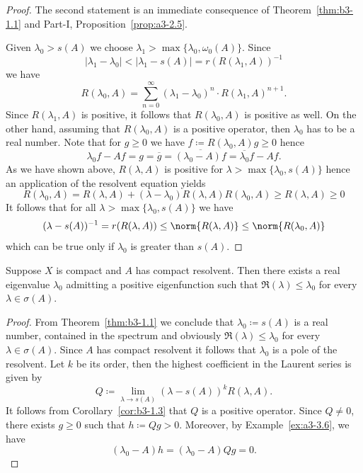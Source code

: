 \begin{proof}
	The second statement is an immediate consequence of Theorem~\ref{thm:b3-1.1} and Part-I, Proposition~\ref{prop:a3-2.5}.
	
	Given $\lambda_0 > s(A)$ we choose $\lambda_1 > \max\{\lambda_0,\omega_{0}(A)\}$.
	Since 
	\[
	\text{$|\lambda_1 - \lambda_0| < |\lambda_1 - s(A)| = r(R(\lambda_1,A))^{-1}$}
	\]
	we have
	\begin{equation}\label{eq:b3-1.10}
		R(\lambda_0,A) = \sum_{n=0}^{\infty} (\lambda_1 - \lambda_0)^n \cdot R(\lambda_1,A)^{n+1}.
	\end{equation}
	Since $R(\lambda_1,A)$ is positive, it follows that $R(\lambda_0,A)$ is positive as well.
	On the other hand, assuming that $R(\lambda_0,A)$ is a positive operator, then $\lambda_0$ has to be a real number.
	Note that for $g \geq 0$ we have $f \coloneqq R(\lambda_0,A)g \geq 0$ hence 
\[
	\lambda_0f - Af = g = \overline{g} = \overline{(\lambda_0 - A)f} = \overline{\lambda_0}f - Af .
\]
%
As we have shown above, $R(\lambda,A)$ is positive for $\lambda > \max\{\lambda_0,s(A)\}$ hence an application of the resolvent equation yields
	\begin{equation}\label{eq:b3-1.11}
		R(\lambda_0,A) = R(\lambda,A) + (\lambda - \lambda_0)R(\lambda,A)R(\lambda_0,A) \geq R(\lambda,A) \geq 0
	\end{equation}
	It follows that for all $\lambda > \max\{\lambda_{0},s(A)\}$ we have
	\begin{equation}\label{eq:b3-1.12}
		(\lambda - s(A))^{-1} = r(R(\lambda,A)) \leq \norm{R(\lambda,A)} \leq \norm{R(\lambda_{0},A)}
	\end{equation}
	which can be true only if\/ $\lambda_{0}$ is greater than $s(A)$.
\end{proof}
\begin{corollary}\label{cor:b3-1.4}
Suppose $X$ is compact and $A$ has compact resolvent.	
	Then there exists a real eigenvalue $\lambda_{0}$ admitting a positive eigenfunction such that 
	$\Re(\lambda) \leq \lambda_{0}$ for every $\lambda \in \sigma(A)$.
\end{corollary}
\begin{proof}
	From Theorem~\ref{thm:b3-1.1} we conclude that $\lambda_{0} \coloneqq s(A)$ is a real number, contained in the spectrum and obviously $\Re(\lambda) \leq \lambda_{0}$ for every $\lambda \in \sigma(A)$.
	Since $A$ has compact resolvent it follows that $\lambda_{0}$ is a pole of the resolvent.
	Let $k$ be its order, then the highest coefficient in the Laurent series is given by
	\begin{equation}\label{eq:b3-1.13}
		Q \coloneqq \lim_{\lambda \to s(A)} (\lambda - s(A))^{k}R(\lambda,A).
	\end{equation}
It follows from Corollary~\ref{cor:b3-1.3} that $Q$ is a positive operator.
Since $Q \neq 0$, there exists $g \geq 0$ such that $h \coloneqq Qg > 0$.
Moreover, by Example~\ref{ex:a3-3.6}, we have 
%
\[
	 (\lambda_{0} - A)h = (\lambda_{0} - A)Qg = 0 .
\]
%
\end{proof}

